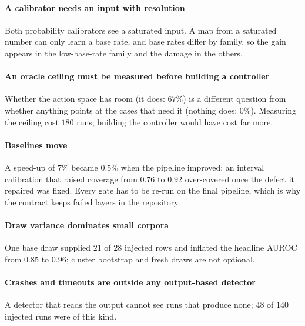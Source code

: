 \documentclass[11pt]{article}
\theoremstyle{plain}
\theoremstyle{definition}
\theoremstyle{remark}
\begin{document}
\paragraph{A calibrator needs an input with resolution} Both probability calibrators see a saturated input. A map from a saturated number can only learn a base rate, and base rates differ by family, so the
gain appears in the low-base-rate family and the damage in the others.
\paragraph{An oracle ceiling must be measured before building a controller} Whether the action space has room (it does: $67\%$) is a different question from whether anything points at the cases that need it (nothing does: $0\%$).
Measuring the ceiling cost $180$ runs; building the controller would have cost far more.
\paragraph{Baselines move} A speed-up of $7\%$ became $0.5\%$ when the pipeline improved; an interval calibration that raised coverage from $0.76$ to $0.92$ over-covered once the defect it repaired was fixed.
Every gate has to be re-run on the final pipeline, which is why the contract keeps failed layers in the repository.
\paragraph{Draw variance dominates small corpora} One base draw supplied $21$ of $28$ injected rows and inflated the headline AUROC from $0.85$ to $0.96$; cluster bootstrap and fresh draws are not optional.
\paragraph{Crashes and timeouts are outside any output-based detector} A detector that reads the output cannot see runs that produce none; $48$ of $140$ injected runs were of this kind.
\end{document}
